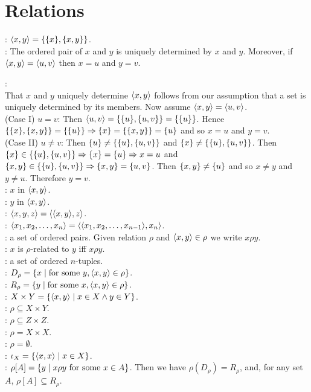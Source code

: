 \documentclass[12pt]{book}
\begin{document}
\section{Relations}
: $\langle x, y\rangle = \{\{x\}, \{x,y\}\}$.\\

: The ordered pair of $x$ and $y$ is uniquely determined by $x$ and $y$. Moreover, if $\langle x,y\rangle = \langle u,v\rangle$ then $x = u$ and $y = v$.

:\\
That $x$ and $y$ uniquely determine $\langle x,y\rangle$ follows from our assumption that a set is uniquely determined by its members. Now assume $\langle x,y\rangle = \langle u,v\rangle$.\\(Case I) $u=v$: Then $\langle u,v\rangle = \{\{u\}, \{u,v\}\} = \{\{u\}\}$. Hence $\{\{x\}, \{x,y\}\} = \{\{u\}\} \Rightarrow \{x\} = \{\{x,y\}\} = \{u\}$ and so $x=u$ and $y=v$.\\(Case II) $u\neq v$: Then $\{u\} \neq \{\{u\}, \{u,v\}\}$ and $\{x\} \neq \{\{u\}, \{u,v\}\}$. Then $\{x\} \in  \{\{u\}, \{u,v\}\} \Rightarrow \{x\} = \{u\} \Rightarrow x = u$ and $\{x,y\} \in  \{\{u\}, \{u,v\}\} \Rightarrow \{x,y\} = \{u,v\}$. Then $\{x,y\} \neq \{u\}$ and so $x \neq y$ and $y \neq u$. Therefore $y = v$.\\

: $x$ in $\langle x,y\rangle$.\\
: $y$ in $\langle x,y\rangle$.\\
: $\langle x,y,z\rangle = \langle\langle x,y\rangle,z\rangle$.\\
: $\langle x_1, x_2, \dots, x_n\rangle = \langle\langle x_1, x_2, \dots, x_{n-1}\rangle, x_n\rangle$.\\
: a set of ordered pairs. Given relation $\rho$ and $\langle x,y\rangle \in \rho$ we write $x\rho y$.\\
: $x$ is $\rho$-related to $y$ iff $x\rho y$.\\
: a set of ordered $n$-tuples.\\
: $D_{\rho} = \{x \mid \text{for some }y, \langle x,y\rangle\in \rho\}$.\\
: $R_{\rho} = \{y \mid \text{for some }x, \langle x,y\rangle\in \rho\}$.\\
: $X \times Y = \{\langle x,y\rangle \mid x \in X \wedge y \in Y\}$.\\
: $\rho \subseteq X \times Y$.\\
: $\rho \subseteq Z \times Z$.\\
: $\rho = X \times X$.\\
: $\rho = \emptyset$.\\
: $\iota_{X} = \{\langle x,x\rangle \mid x \in X\}$.\\
: $\rho[A]= \{y \mid x\rho y \text{ for some } x\in A\}$. Then we have $\rho(D_{\rho}) = R_{\rho}$, and, for any set $A$, $\rho[A] \subseteq R_{\rho}$.
\end{document}
